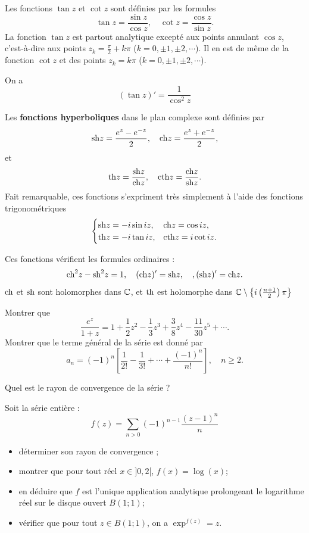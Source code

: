 Les fonctions $\tan z$ et $\cot z$ sont définies par les formules
\[\tan z= \frac{\sin z}{\cos z}, \quad \cot z =  \frac{\cos z}{\sin z}.\]
La fonction $\tan z$ est partout analytique excepté aux points annulant $\cos z$, c'est-à-dire aux points $z_k=\frac{\pi}{2} + k\pi$ ($k=0, \pm 1, \pm 2, \cdots$). Il en est de même de la fonction $\cot z$ et des points $z_k= k\pi$ ($k=0, \pm 1, \pm 2, \cdots$).

On a \[ (\tan z)' = \frac{1}{\cos^2 z} \]

Les \textbf{fonctions hyperboliques} dans le plan complexe sont définies par
\[\mathrm{sh} z= \frac{e^z-e^{-z}}{2}, \quad \mathrm{ch} z= \frac{e^z+e^{-z}}{2},\]
et
\[\mathrm{th} z=\frac{\mathrm{sh} z}{\mathrm{ch} z}, \quad \mathrm{cth} z=\frac{\mathrm{ch} z}{\mathrm{sh} z}.\]
Fait remarquable, ces fonctions s'expriment très simplement à l'aide des fonctions trigonométriques
\[\begin{cases}
\mathrm{sh} z= - i \sin iz, & \mathrm{ch} z=\cos iz,\\
\mathrm{th} z= -i \tan i z, & \mathrm{cth} z=i \cot iz.
\end{cases}\]

Ces fonctions vérifient les formules ordinaires : 
\[\mathrm{ch} ^2 z-\mathrm{sh}^2 z = 1, \quad (\mathrm{ch} z)^\prime= \mathrm{sh} z, \quad, (\mathrm{sh} z)^\prime=\mathrm{ch} z.\] 
$\mathrm{ch}$ et $\mathrm{sh}$ sont holomorphes dans $\mathbb{C}$, et $\mathrm{th}$ est holomorphe dans $\mathbb{C} \setminus \big\{ i\left( \frac{n+1}{2} \right) \pi \big\}$

\begin{exercice}
Montrer que 
\[\frac{e^z}{1+z}=1+\frac{1}{2}z^2 - \frac{1}{3}z^3 + \frac{3}{8}z^4 -\frac{11}{30}z^5 + \cdots.\]
Montrer que le terme général de la série est donné par
\[a_n=(-1)^n \left[\frac{1}{2!} - \frac{1}{3!} + \cdots + \frac{(-1)^n}{n!}\right], \quad n \geq 2.\]

Quel est le rayon de convergence de la série ?
\end{exercice}

\begin{exercice} \label{ex:log}
Soit la série entière :
\[f(z)= \sum_{n >0}(-1)^{n-1}\frac{(z-1)^n}{n}
\]
\begin{itemize}
  \item déterminer son rayon de convergence ;
  \item montrer que pour tout réel $x \in ]0,2[$, $f(x)=\log(x)$;
  \item en déduire que $f$ est l'unique application analytique prolongeant le
  logarithme réel sur le disque ouvert $B(1 ; 1)$;
  \item vérifier que pour tout $z \in B(1 ;1)$, on a $\exp^{f(z)}=z$.
\end{itemize}
\end{exercice}






